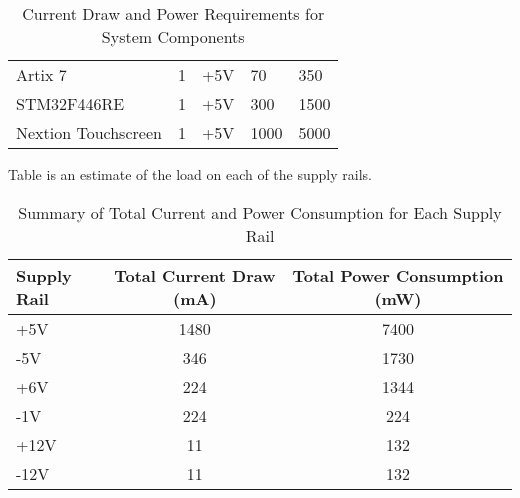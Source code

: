 \begin{table}[ht]
\begin{tabular}{@{}lcp{1.5cm}p{1.8cm}p{2cm}@{}}
            Artix 7                  & 1               & +5V                   & 70                         & 350                               \\
            STM32F446RE                    & 1               & +5V                  & 300                        & 1500                             \\
            Nextion Touchscreen       & 1               & +5V                  & 1000                       & 5000                             \\ \bottomrule
            \end{tabular}
            \caption{Current Draw and Power Requirements for System Components}
            \label{tab:A_current_draw_power}
            \end{table}
Table  is an estimate of the load on each of the supply rails.
            \begin{table}[ht]
                \centering
                \begin{tabular}{@{}lcc@{}}
                \toprule
                \textbf{Supply Rail} & \textbf{Total Current Draw (mA)} & \textbf{Total Power Consumption (mW)} \\ \midrule
                +5V                  & 1480                            & 7400                                  \\
                -5V                  & 346                             & 1730                                  \\
                +6V                  & 224                             & 1344                                  \\
                -1V                  & 224                             & 224                                   \\
                +12V                 & 11                              & 132                                   \\
                -12V                 & 11                              & 132                                   \\ \bottomrule
                \end{tabular}
                \caption{Summary of Total Current and Power Consumption for Each Supply Rail}
                \label{tab:total_power_current}
                \end{table}
                